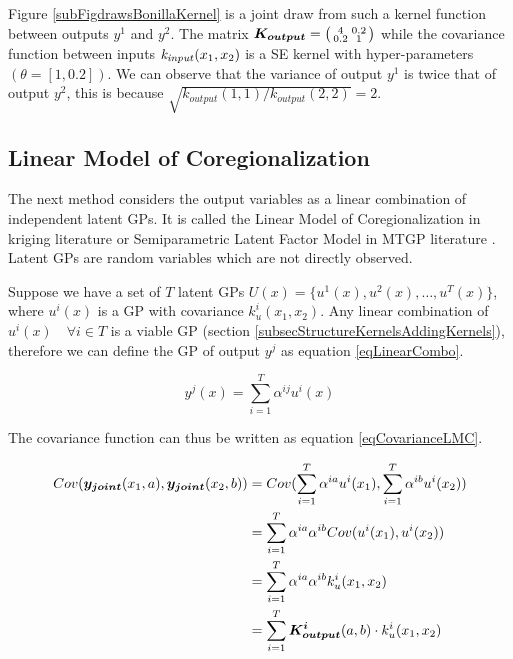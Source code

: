 Figure \ref{subFigdrawsBonillaKernel} is a joint draw from such a kernel function between outputs $y^{1}$ and $y^{2}$. The matrix $\boldsymbol{K_{output}} = \bigl( \begin{smallmatrix} 4 & 0.2\\ 0.2 & 1\end{smallmatrix}\bigr)$ while the covariance function between inputs $\mathit{k_{input}}(x_{1}, x_{2})$ is a SE kernel with hyper-parameters $(\theta = [1, 0.2])$. We can observe that the variance of output $y^{1}$ is twice that of output $y^{2}$, this is because $\sqrt{k_{output}(1, 1)/k_{output}(2, 2)} = 2$.


\subsection{Linear Model of Coregionalization}\label{subsecLMC}
The next method considers the output variables as a linear combination of independent latent GPs. It is called the Linear Model of Coregionalization in kriging literature \cite{goovaerts1997geostatistics} or Semiparametric Latent Factor Model in MTGP literature \cite{seeger2005semiparametric}. Latent GPs are random variables which are not directly observed. 

Suppose we have a set of $T$ latent GPs $U(x) = \{u^{1}(x), u^2(x), \ldots, u^{T}(x)\}$, where $u^{i}(x)$ is a GP with covariance $k_{u}^{i}(x_{1}, x_{2})$. Any linear combination of $u^{i}(x) \quad \forall i \in T$ is a viable GP (section \ref{subsecStructureKernelsAddingKernels}), therefore we can define the GP of output $y^{j}$ as equation \ref{eqLinearCombo}. 

\begin{equation}\label{eqLinearCombo}
y^{j}(x) = \sum_{i=1}^{T} \alpha^{ij}u^{i}(x)
\end{equation}

The covariance function can thus be written as equation \ref{eqCovarianceLMC}.

\begin{equation}\label{eqCovarianceLMC} 
 \begin{aligned}
Cov(\boldsymbol{y_{joint}}(x_{1}, a), \boldsymbol{y_{joint}}(x_{2}, b)) & = Cov(\sum_{i=1}^{T} \alpha^{ia}u^{i}(x_{1}), \sum_{i=1}^{T} \alpha^{ib}u^{i}(x_{2})) \\ 
& = \sum_{i=1}^{T} \alpha^{ia}\alpha^{ib} Cov(u^{i}(x_{1}), u^{i}(x_{2})) \\ 
& = \sum_{i=1}^{T} \alpha^{ia}\alpha^{ib}k_{u}^{i}(x_{1}, x_{2}) \\ 
& = \sum_{i=1}^{T} \boldsymbol{K_{output}^{i}}(a, b) \cdot k_{u}^{i}(x_{1}, x_{2})
 \end{aligned}
\end{equation}

